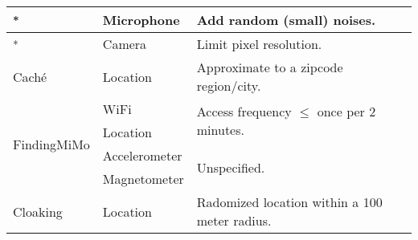\begin{table}
\begin{tabular}{|l|l|l|}
\cite{clarkson2012breaking}\textsuperscript{*} & Microphone & 
Add random (small) noises. \\ \hline

\cite{lukas2006digital}\textsuperscript{*} & Camera & Limit pixel resolution. \\ \hline



Cach{\'e}~\cite{amini2011cache} & Location & Approximate to a zipcode region/city.    \\\hline


\multirow{4}{*}{FindingMiMo \cite{shin2011findingmimo}} 
& WiFi & \multirow{2}{3cm}{Access frequency $\leq$ once per 2 minutes.}  \\ \cline{2-2}
& Location &  \\\cline{2-3}
& Accelerometer & \multirow{2}{*}{Unspecified.}  \\ \cline{2-2}
& Magnetometer &   \\ \hline


\multirow{2}{*}{Cloaking~\cite{gruteser2003anonymous}} & \multirow{2}{*}{Location} 
& \multirow{2}{3.5cm}{Radomized location within a 100 meter radius.}  \\ 
& & \\ \hline


\end{tabular}
\end{table}
